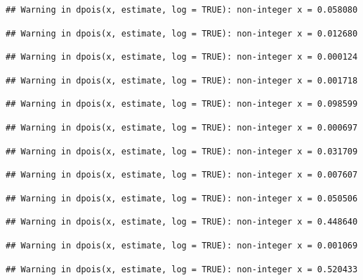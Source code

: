 \documentclass[]{article}
\begin{document}
\begin{verbatim}
## Warning in dpois(x, estimate, log = TRUE): non-integer x = 0.058080
\end{verbatim}

\begin{verbatim}
## Warning in dpois(x, estimate, log = TRUE): non-integer x = 0.012680
\end{verbatim}

\begin{verbatim}
## Warning in dpois(x, estimate, log = TRUE): non-integer x = 0.000124
\end{verbatim}

\begin{verbatim}
## Warning in dpois(x, estimate, log = TRUE): non-integer x = 0.001718
\end{verbatim}

\begin{verbatim}
## Warning in dpois(x, estimate, log = TRUE): non-integer x = 0.098599
\end{verbatim}

\begin{verbatim}
## Warning in dpois(x, estimate, log = TRUE): non-integer x = 0.000697
\end{verbatim}

\begin{verbatim}
## Warning in dpois(x, estimate, log = TRUE): non-integer x = 0.031709
\end{verbatim}

\begin{verbatim}
## Warning in dpois(x, estimate, log = TRUE): non-integer x = 0.007607
\end{verbatim}

\begin{verbatim}
## Warning in dpois(x, estimate, log = TRUE): non-integer x = 0.050506
\end{verbatim}

\begin{verbatim}
## Warning in dpois(x, estimate, log = TRUE): non-integer x = 0.448640
\end{verbatim}

\begin{verbatim}
## Warning in dpois(x, estimate, log = TRUE): non-integer x = 0.001069
\end{verbatim}

\begin{verbatim}
## Warning in dpois(x, estimate, log = TRUE): non-integer x = 0.520433
\end{verbatim}
\end{document}

